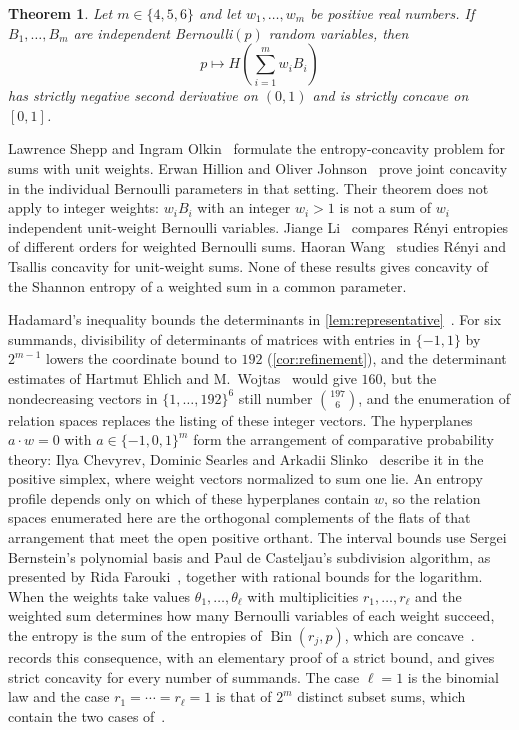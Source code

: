 \documentclass[11pt,a4paper]{article}
\numberwithin{equation}{section}
\newtheorem{theorem}{Theorem}[section]
\theoremstyle{remark}
\begin{document}
\begin{theorem}\label{thm:main}
Let $m\in\{4,5,6\}$ and let $w_1,\ldots,w_m$ be positive real numbers. If $B_1,\ldots,B_m$ are independent Bernoulli$(p)$ random variables, then
\[
 p\longmapsto H\!\left(\sum_{i=1}^m w_i B_i\right)
\]
has strictly negative second derivative on $(0,1)$ and is strictly concave on $[0,1]$.
\end{theorem}

Lawrence Shepp and Ingram Olkin~\cite{SO} formulate the entropy-concavity problem for sums with unit weights. Erwan Hillion and Oliver Johnson~\cite{HJ} prove joint concavity in the individual Bernoulli parameters in that setting. Their theorem does not apply to integer weights: $w_iB_i$ with an integer $w_i>1$ is not a sum of $w_i$ independent unit-weight Bernoulli variables. Jiange Li~\cite{Li} compares R\'enyi entropies of different orders for weighted Bernoulli sums. Haoran Wang~\cite{Wang} studies R\'enyi and Tsallis concavity for unit-weight sums. None of these results gives concavity of the Shannon entropy of a weighted sum in a common parameter.

Hadamard's inequality bounds the determinants in \cref{lem:representative}~\cite{Matrix}. For six summands, divisibility of determinants of matrices with entries in $\{-1,1\}$ by $2^{m-1}$ lowers the coordinate bound to $192$ (\cref{cor:refinement}), and the determinant estimates of Hartmut Ehlich and M.~Wojtas~\cite{Ehlich,Wojtas} would give $160$, but the nondecreasing vectors in $\{1,\ldots,192\}^6$ still number $\binom{197}{6}$, and the enumeration of relation spaces replaces the listing of these integer vectors. The hyperplanes $a\cdot w=0$ with $a\in\{-1,0,1\}^m$ form the arrangement of comparative probability theory: Ilya Chevyrev, Dominic Searles and Arkadii Slinko~\cite[Section~2.4]{CSS} describe it in the positive simplex, where weight vectors normalized to sum one lie. An entropy profile depends only on which of these hyperplanes contain $w$, so the relation spaces enumerated here are the orthogonal complements of the flats of that arrangement that meet the open positive orthant. The interval bounds use Sergei Bernstein's polynomial basis and Paul de Casteljau's subdivision algorithm, as presented by Rida Farouki~\cite{Farouki}, together with rational bounds for the logarithm. When the weights take values $\theta_1,\ldots,\theta_\ell$ with multiplicities $r_1,\ldots,r_\ell$ and the weighted sum determines how many Bernoulli variables of each weight succeed, the entropy is the sum of the entropies of $\operatorname{Bin}(r_j,p)$, which are concave~\cite{SO,HJ}.  records this consequence, with an elementary proof of a strict bound, and gives strict concavity for every number of summands. The case $\ell=1$ is the binomial law and the case $r_1=\cdots=r_\ell=1$ is that of $2^m$ distinct subset sums, which contain the two cases of~\cite[Proposition~3.1]{Neun}.
\end{document}

